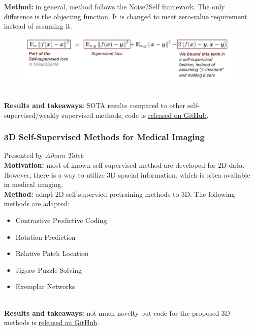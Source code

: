 {\bf Method:} in general, method follows the Noise2Self framework. The only difference is the objecting function. It is changed to meet zero-value requirement instead of assuming it. \\

\begin{figure}[h!]
    \centering
    \includegraphics[scale=0.4]{neurips-2020/images/Screenshot 2020-12-12 at 14.58.30.png}
\end{figure} \\

{\bf Results and takeaways:} SOTA results compared to other self-supervised/weakly supervised methods, code is \href{https://github.com/divelab/Noise2Same}{released on GitHub}. \\




\subsubsection{3D Self-Supervised Methods for Medical Imaging \cite{TalebLDSGBL20}}

Presented by \textit{Aiham Taleb}  \\

{\bf Motivation:} most of known self-supervised method are developed for 2D data. However, there is a way to utilize 3D spacial information, which is often available in medical imaging. \\

{\bf Method:} adapt 2D self-supervied pretraining methods to 3D. The following methods are adapted:
\begin{itemize}
    \item Contrastive Predictive Coding
    \item Rotation Prediction
    \item Relative Patch Location
    \item Jigsaw Puzzle Solving
    \item Exemplar Networks
\end{itemize} \\

{\bf Results and takeaways:} not much novelty but code for the proposed 3D methods is \href{https://github.com/HealthML/self-supervised-3d-tasks}{released on GitHub}. \\